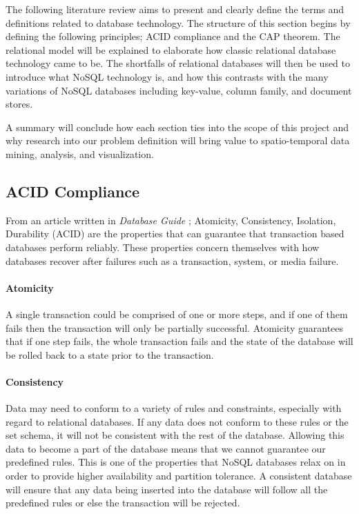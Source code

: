 The following literature review aims to present and clearly define the terms and definitions related to database technology. The structure of this section begins by defining the following principles; ACID compliance and the CAP theorem. The relational model will be explained to elaborate how classic relational database technology came to be. The shortfalls of relational databases will then be used to introduce what NoSQL technology is, and how this contrasts with the many variations of NoSQL databases including key-value, column family, and document stores.

A summary will conclude how each section ties into the scope of this project and why research into our problem definition will bring value to spatio-temporal data mining, analysis, and visualization.

\subsection{ACID Compliance}
\label{sec:acid}

From an article written in \emph{Database Guide} \cite{acid}; Atomicity, Consistency, Isolation, Durability (ACID) are the properties that can guarantee that transaction based databases perform reliably. These properties concern themselves with how databases recover after failures such as a transaction, system, or media failure.

\paragraph{Atomicity}
A single transaction could be comprised of one or more steps, and if one of them fails then the transaction will only be partially successful. Atomicity guarantees that if one step fails, the whole transaction fails and the state of the database will be rolled back to a state prior to the transaction.

\paragraph{Consistency}
Data may need to conform to a variety of rules and constraints, especially with regard to relational databases. If any data does not conform to these rules or the set schema, it will not be consistent with the rest of the database. Allowing this data to become a part of the database means that we cannot guarantee our predefined rules. This is one of the properties that NoSQL databases relax on in order to provide higher availability and partition tolerance. A consistent database will ensure that any data being inserted into the database will follow all the predefined rules or else the transaction will be rejected.

